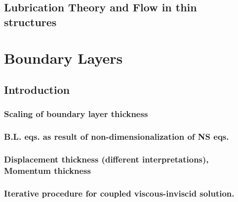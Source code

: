 \documentclass[oneside,a4paper,11pt]{report}
\begin{document}
\section{Lubrication Theory and Flow in thin structures}

%
\chapter{Boundary Layers}
%

\section{Introduction}

\subsection{Scaling of boundary layer thickness}

\subsection{B.L. eqs. as result of non-dimensionalization of NS eqs.}

\subsection{Displacement thickness (different interpretations), Momentum thickness}

\subsection{Iterative procedure for coupled viscous-inviscid solution.}
\end{document}
